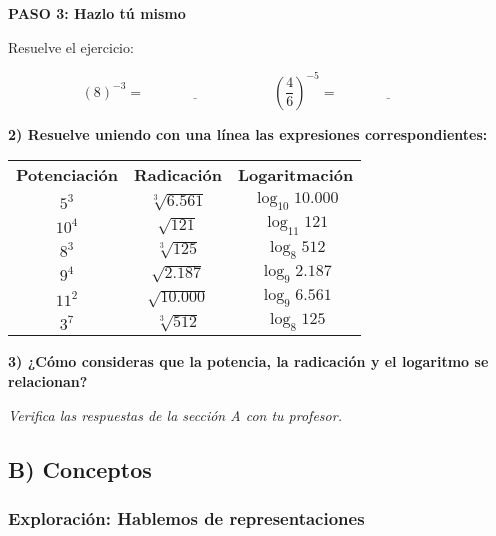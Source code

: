 \documentclass[12pt,a4paper]{article}
\begin{document}
\vspace{0.5cm}

\textbf{PASO 3: Hazlo tú mismo}

Resuelve el ejercicio:

$$(8)^{-3} = \underline{\hspace{3cm}} \qquad \left(\frac{4}{6}\right)^{-5} = \underline{\hspace{3cm}}$$


\vspace{0.5cm}

\textbf{2) Resuelve uniendo con una línea las expresiones correspondientes:}

\vspace{0.5cm}

\begin{center}
\begin{tabular}{ccc}
\textbf{Potenciación} & \textbf{Radicación} & \textbf{Logaritmación} \\[0.3cm]
$5^3$ & $\sqrt[3]{6.561}$ & $\log_{10} 10.000$ \\[0.2cm]
$10^4$ & $\sqrt{121}$ & $\log_{11} 121$ \\[0.2cm]
$8^3$ & $\sqrt[3]{125}$ & $\log_8 512$ \\[0.2cm]
$9^4$ & $\sqrt{2.187}$ & $\log_9 2.187$ \\[0.2cm]
$11^2$ & $\sqrt{10.000}$ & $\log_9 6.561$ \\[0.2cm]
$3^7$ & $\sqrt[3]{512}$ & $\log_8 125$ \\
\end{tabular}
\end{center}

\vspace{0.5cm}

\textbf{3) ¿Cómo consideras que la potencia, la radicación y el logaritmo se relacionan?}

\vspace{1cm}

\textit{Verifica las respuestas de la sección A con tu profesor.}

\vspace{1cm}

\subsection*{B) Conceptos}

\subsubsection*{Exploración: Hablemos de representaciones}
\end{document}
